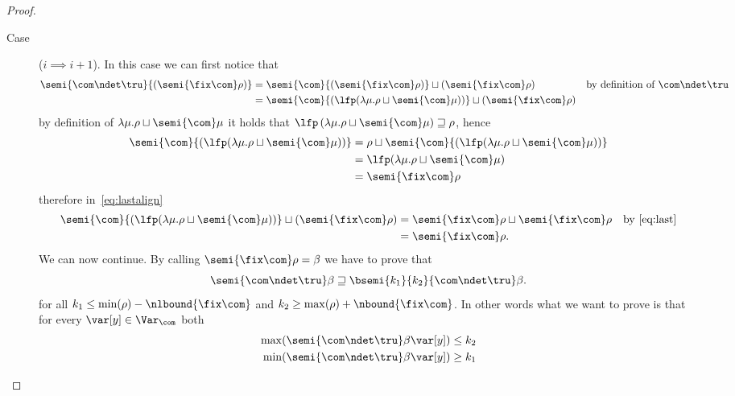 \begin{proof}
\begin{inductive}
\begin{description}
    \item[Case] (\(i \implies i+1\)). In this case we can first
      notice that
      \begin{align}
        \semi{\com\ndet\tru}{\left(\semi{\fix\com}\rho\right)} & = \semi{\com}{\left(\semi{\fix\com}\rho\right)} \sqcup {\left(\semi{\fix\com}\rho\right)} & \text{by definition of } \com\ndet\tru \nonumber \\
                                                                             & = \semi{\com}{\left(\lfp(\lambda \mu . \rho \sqcup \semi{\com}\mu )\right)} \sqcup \left(\semi{\fix\com}\rho\right) \label{eq:lastalign}
      \end{align}
      by definition of
      \(\lambda \mu . \rho \sqcup \semi{\com}\mu\) it holds
      that
      \(\lfp\left(\lambda \mu . \rho \sqcup
        \semi{\com}\mu\right)\sqsupseteq \rho\), hence
      \begin{align}
        \semi{\com}{\left(\lfp(\lambda \mu . \rho \sqcup \semi{\com}\mu )\right)} & = \rho \sqcup \semi{\com}{\left(\lfp(\lambda \mu . \rho \sqcup \semi{\com}\mu )\right)} \nonumber\\
                                                                                                & = {\lfp(\lambda \mu . \rho \sqcup \semi{\com}\mu )} \nonumber \\
                                                                                                & = \semi{\fix\com}\rho \label{eq:last}
      \end{align}
      therefore in~\eqref{eq:lastalign}
      \begin{align*}
        \semi{\com}{\left(\lfp(\lambda \mu . \rho \sqcup \semi{\com}\mu )\right)} \sqcup \left(\semi{\fix\com}\rho\right)
        & = \semi{\fix\com}\rho \sqcup \semi{\fix\com}\rho & \text{by~\eqref{eq:last}}\\
        & = \semi{\fix\com}\rho.
      \end{align*}
      We can now continue. By calling
      \(\semi{\fix\com}\rho = \beta\) we have to prove that
      \begin{equation}\label{eq:boundless}
        \semi{\com\ndet\tru}\beta \sqsupseteq \bsemi{k_1}{k_2}{\com\ndet\tru}\beta.
      \end{equation}
      for all \(k_1 \leq \min(\rho) - \nlbound{\fix\com}\) and
      \(k_2 \geq \max(\rho) + \nbound{\fix\com}\). In other words what
      we want to prove is that for every \(\var[y] \in \Var_{\com}\)
      both
      \begin{align*}
        \max(\semi{\com\ndet\tru}\beta\var[y]) & \leq k_2 \\
        \min(\semi{\com\ndet\tru}\beta\var[y]) & \geq k_1
      \end{align*}


\end{description}
\end{inductive}
\end{proof}
